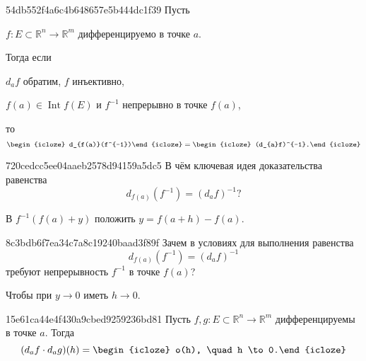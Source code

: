 \begin{note}{54db552f4a6c4b648657e5b444dc1f39}
    Пусть \begin{icloze}{5}\({ f : E \subset \mathbb R^{n} \to \mathbb R^{m} }\) дифференцируемо в точке \({ a }\).\end{icloze}
    Тогда если \begin{icloze}{3}\({ d_{a}f }\) обратим, \({ f }\) инъективно,\end{icloze} \begin{icloze}{2}\({ f(a) \in \operatorname{Int} f(E) }\) и \({ f^{-1} }\) непрерывно в точке \({ f(a) }\),\end{icloze} то
    \[
        \begin{icloze}{4}d_{f(a)}(f^{-1})\end{icloze} = \begin{icloze}{1}(d_{a}f)^{-1}.\end{icloze}
    \]
\end{note}

\begin{note}{720cedcc5ee04aaeb2578d94159a5dc5}
    В чём ключевая идея доказательства равенства
    \[
        d_{f(a)}(f^{-1}) = (d_{a}f)^{-1}?
    \]

    \begin{cloze}{1}
        В \({ f^{-1}(f(a) + y) }\) положить \({ y = f(a + h) - f(a) }\).
    \end{cloze}
\end{note}

\begin{note}{8c3bdb6f7ea34c7a8c19240baad3f89f}
    Зачем в условиях для выполнения равенства
    \[
        d_{f(a)}(f^{-1}) = (d_{a}f)^{-1}
    \]
    требуют непрерывность \({ f^{-1} }\) в точке \({ f(a) }\)?

    \begin{cloze}{1}
        Чтобы при \({ y \to 0 }\) иметь \({ h \to 0 }\).
    \end{cloze}
\end{note}

\begin{note}{15e61ca44e4f430a9cbed9259236bd81}
    Пусть \({ f, g : E \subset \mathbb R^{n} \to \mathbb R^{m} }\) дифференцируемы в точке \({ a }\).
    Тогда
    \[
        (d_{a}f \cdot d_{a}g)(h) = \begin{icloze}{1}o(h), \quad h \to 0.\end{icloze}
    \]
\end{note}

